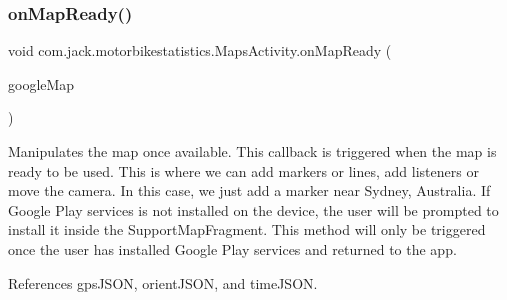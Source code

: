 \subsubsection{\texorpdfstring{on\+Map\+Ready()}{onMapReady()}}
{\footnotesize\ttfamily void com.\+jack.\+motorbikestatistics.\+Maps\+Activity.\+on\+Map\+Ready (\begin{DoxyParamCaption}\item[{Google\+Map}]{google\+Map }\end{DoxyParamCaption})\hspace{0.3cm}{\ttfamily [inline]}}

Manipulates the map once available. This callback is triggered when the map is ready to be used. This is where we can add markers or lines, add listeners or move the camera. In this case, we just add a marker near Sydney, Australia. If Google Play services is not installed on the device, the user will be prompted to install it inside the Support\+Map\+Fragment. This method will only be triggered once the user has installed Google Play services and returned to the app. 

References gps\+J\+S\+ON, orient\+J\+S\+ON, and time\+J\+S\+ON.


